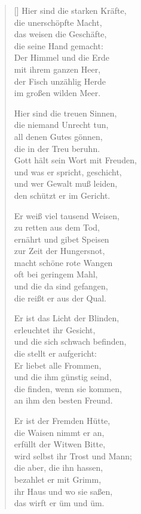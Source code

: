 \begin{multicols}{2}
\begin{verse}[\versewidth]
 Hier sind die starken Kräfte,\\
die unerschöpfte Macht,\\
das weisen die Geschäfte,\\
die seine Hand gemacht:\\
Der Himmel und die Erde\\
mit ihrem ganzen Heer,\\
der Fisch unzählig Herde\\
im großen wilden Meer.

 Hier sind die treuen Sinnen,\\
die niemand Unrecht tun,\\
all denen Gutes gönnen,\\
die in der Treu beruhn.\\
Gott hält sein Wort mit Freuden,\\
und was er spricht, geschicht,\\
und wer Gewalt muß leiden,\\
den schützt er im Gericht.

 Er weiß viel tausend Weisen,\\
zu retten aus dem Tod,\\
ernährt und gibet Speisen\\
zur Zeit der Hungersnot,\\
macht schöne rote Wangen\\
oft bei geringem Mahl,\\
und die da sind gefangen,\\
die reißt er aus der Qual.

 Er ist das Licht der Blinden,\\
erleuchtet ihr Gesicht,\\
und die sich schwach befinden,\\
die stellt er aufgericht:\\
Er liebet alle Frommen,\\
und die ihm günstig seind,\\
die finden, wenn sie kommen,\\
an ihm den besten Freund.

 Er ist der Fremden Hütte,\\
die Waisen nimmt er an,\\
erfüllt der Witwen Bitte,\\
wird selbst ihr Trost und Mann;\\
die aber, die ihn hassen,\\
bezahlet er mit Grimm,\\
ihr Haus und wo sie saßen,\\
das wirft er üm und üm.


\end{verse}
\end{multicols}
